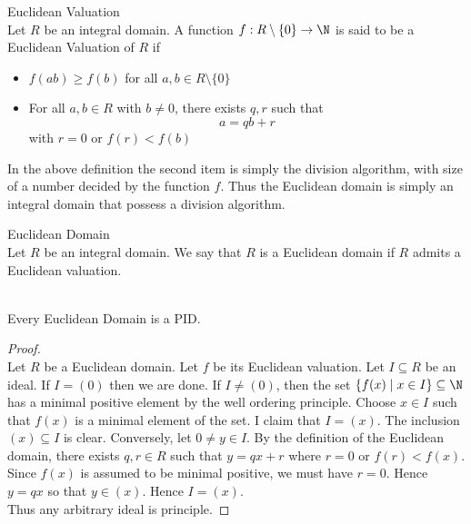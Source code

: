 \documentclass[a4paper]{article}
\begin{document}
\begin{defn}{Euclidean Valuation}{}\\
Let $R$ be an integral domain. A function $f:R\setminus\{0\}\to\N$ is said to be a Euclidean Valuation of $R$ if
\begin{itemize}
\item $f(ab)\geq f(b)$ for all $a,b\in R\setminus\{0\}$
\item For all $a,b\in R$ with $b\neq0$, there exists $q,r$ such that $$a=qb+r$$ with $r=0$ or $f(r)<f(b)$
\end{itemize}
\end{defn}

In the above definition the second item is simply the division algorithm, with size of a number decided by the function $f$. Thus the Euclidean domain is simply an integral domain that possess a division algorithm. 

\begin{defn}{Euclidean Domain}{}\\
Let $R$ be an integral domain. We say that $R$ is a Euclidean domain if $R$ admits a Euclidean valuation. 
\end{defn}

\begin{prp}{}{}\\
Every Euclidean Domain is a PID. 
\begin{proof}\\
Let $R$ be a Euclidean domain. Let $f$ be its Euclidean valuation. Let $I\subseteq R$ be an ideal. If $I=(0)$ then we are done. If $I\neq(0)$, then the set $\{f(x)\;|\;x\in I\}\subseteq\N$ has a minimal positive element by the well ordering principle. Choose $x\in I$ such that $f(x)$ is a minimal element of the set. I claim that $I=(x)$. The inclusion $(x)\subseteq I$ is clear. Conversely, let $0\neq y\in I$. By the definition of the Euclidean domain, there exists $q,r\in R$ such that $y=qx+r$ where $r=0$ or $f(r)<f(x)$. Since $f(x)$ is assumed to be minimal positive, we must have $r=0$. Hence $y=qx$ so that $y\in(x)$. Hence $I=(x)$. \\

Thus any arbitrary ideal is principle. 
\end{proof}
\end{prp}
\end{document}
